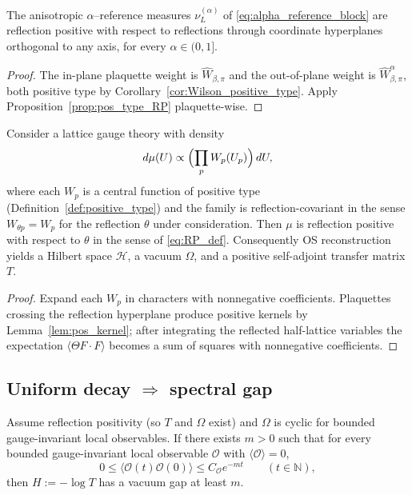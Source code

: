 \begin{corollary}\label{cor:alpha_reference_RP}
The anisotropic $\alpha$--reference measures $\nu_L^{(\alpha)}$ of \eqref{eq:alpha_reference_block}
are reflection positive with respect to reflections through coordinate hyperplanes orthogonal to any axis, for every $\alpha\in(0,1]$.
\end{corollary}
\begin{proof}
The in-plane plaquette weight is $\widehat W_{\beta,\pi}$ and the out-of-plane weight is $\widehat W_{\beta,\pi}^\alpha$, both positive type by Corollary~\ref{cor:Wilson_positive_type}.
Apply Proposition~\ref{prop:pos_type_RP} plaquette-wise.
\end{proof}



\begin{proposition}\label{prop:pos_type_RP}
Consider a lattice gauge theory with density
\[
d\mu(U)\propto \Bigl(\prod_{p} W_p(U_p)\Bigr)\,dU,
\]
where each $W_p$ is a central function of positive type (Definition~\ref{def:positive_type}) and the family is reflection-covariant in the sense
$W_{\theta p}=W_p$ for the reflection $\theta$ under consideration.
Then $\mu$ is reflection positive with respect to $\theta$ in the sense of \eqref{eq:RP_def}.
Consequently OS reconstruction yields a Hilbert space $\mathcal H$, a vacuum $\Omega$, and a positive self-adjoint transfer matrix $T$.
\end{proposition}
\begin{proof}

Expand each $W_p$ in characters with nonnegative coefficients. Plaquettes crossing the reflection hyperplane produce positive kernels by Lemma~\ref{lem:pos_kernel};
after integrating the reflected half-lattice variables the expectation $\langle \Theta F\cdot F\rangle$ becomes a sum of squares with nonnegative coefficients.
\end{proof}


\subsection{Uniform decay \texorpdfstring{$\Rightarrow$}{implies} spectral gap}

\begin{theorem}\label{thm:F_decay_implies_gap}
Assume reflection positivity (so $T$ and $\Omega$ exist) and $\Omega$ is cyclic for bounded gauge-invariant local observables.
If there exists $m>0$ such that for every bounded gauge-invariant local observable $\mathcal O$ with $\langle\mathcal O\rangle=0$,
\begin{equation}\label{eq:exp_decay_assumption}
0\le \langle \mathcal O(t)\mathcal O(0)\rangle\le C_{\mathcal O}e^{-mt}\qquad (t\in\mathbb N),
\end{equation}
then $H:=-\log T$ has a vacuum gap at least $m$.
\end{theorem}

